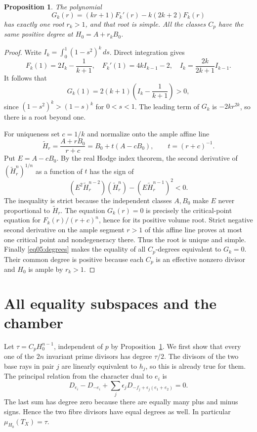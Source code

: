 \documentclass[11pt]{amsart}
\newtheorem{proposition}[theorem]{Proposition}
\theoremstyle{definition}
\theoremstyle{remark}
\begin{document}
\begin{proposition}\label{prop05:root}
The polynomial
\begin{equation}\label{eq05:g}
 G_k(r)=(kr+1)F_k'(r)-k(2k+2)F_k(r)
\end{equation}
has exactly one root \(r_k>1\), and that root is simple. All the
classes \(C_p\) have the same positive degree at
\(H_0=A+r_kB_0\).
\end{proposition}

\begin{proof}
Write \(I_k=\int_0^1(1-s^2)^k\,ds\). Direct integration gives
\[
 F_k(1)=2I_k-\frac1{k+1},\quad
 F_k'(1)=4kI_{k-1}-2,\quad
 I_k=\frac{2k}{2k+1}I_{k-1}.
\]
It follows that
\[
 G_k(1)=2(k+1)\left(I_k-\frac1{k+1}\right)>0,
\]
since \((1-s^2)^k>(1-s)^k\) for \(0<s<1\).
The leading term of \(G_k\) is \(-2kr^{2k}\), so there is a
root beyond one.

For uniqueness set \(c=1/k\) and normalize onto the ample affine line
\[
 \widetilde H_r=\frac{A+rB_0}{r+c}
   =B_0+t(A-cB_0),\qquad t=(r+c)^{-1}.
\]
Put \(E=A-cB_0\). By the real Hodge index theorem,
the second derivative of \((\widetilde H_r^n)^{1/n}\) as a
function of \(t\) has the sign of
\[
 (E^2\widetilde H_r^{n-2})(\widetilde H_r^n)
       -(E\widetilde H_r^{n-1})^2<0.
\]
The inequality is strict because the independent classes \(A,B_0\)
make \(E\) never proportional to \(\widetilde H_r\).
The equation \(G_k(r)=0\) is precisely the critical-point equation
for \(F_k(r)/(r+c)^n\), hence for its positive volume root.
Strict negative second derivative on the ample segment \(r>1\)
of this affine line proves at
most one critical point and nondegeneracy there. Thus the root is
unique and simple. Finally \eqref{eq05:degrees} makes the equality
of all \(C_p\)-degrees equivalent to \(G_k=0\). Their common
degree is positive because each \(C_p\) is an effective nonzero
divisor and \(H_0\) is ample by \(r_k>1\).
\end{proof}

\section{All equality subspaces and the chamber}\label{sec06:classification}

Let \(\tau=C_pH_0^{n-1}\), independent of \(p\) by
Proposition~\ref{prop05:root}. We first show that every one of the
\(2n\) invariant prime divisors has degree \(\tau/2\).
The divisors of the two base rays in pair \(j\) are linearly
equivalent to \(h_j\), so this is already true for them.
The principal relation from the character dual to \(e_i\) is
\[
 D_{e_i}-D_{-e_i}
   +\sum_j\epsilon_jD_{-f_j+\epsilon_j(e_1+e_2)}=0.
\]
The last sum has degree zero because there are equally many plus and
minus signs. Hence the two fibre divisors have equal degrees as well.
In particular \(\mu_{H_0}(T_X)=\tau\).
\end{document}
